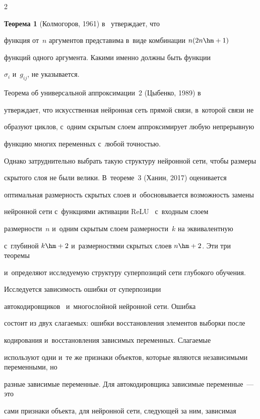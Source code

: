 \begin{multicols}{2}
\noindent


\textbf{Теорема 1} (Колмогоров, 1961) в~\cite{twentythree} утверждает, что 


функция от~$n$ аргументов представима в~виде комбинации $n(2n \hm+ 1)$ 


функций одного аргумента. Какими именно должны быть функции 


$\sigma_i$ и~$g_{ij}$, не указывается.


Теорема об универсальной аппроксимации~2 (Цыбенко, 1989) в~\cite{twentythree} 


утверждает, что искусственная нейронная сеть прямой связи, в~которой связи не 


образуют циклов, с~одним скрытым слоем аппроксимирует любую непрерывную 


функцию многих переменных с~любой точностью.


Однако затруднительно выбрать такую структуру нейронной сети, чтобы размеры 


скрытого слоя не были велики. В~теореме~3 (Ханин, 2017) оценивается 


оптимальная размерность скрытых слоев и~обосновывается возможность замены 


нейронной сети с~функциями активации ReLU~\cite{twentythree} с~входным слоем 


раз\-мер\-ности~$n$ и~одним скрытым слоем раз\-мер\-ности~$k$ на эквивалентную 


с~глубиной $k\hm+2$ и~размерностями скрытых слоев $n \hm+ 2$. Эти три тео\-ре\-мы 


и~определяют исследуемую структуру суперпозиций сети глубокого обучения.





Исследуется зависимость ошибки от суперпозиции 


автокодировщиков~\cite{eighteen} и~многослойной нейронной сети. Ошибка 


состоит из двух слагаемых: ошибки восстановления элементов выборки после 


кодирования и~восстановления зависимых переменных. Слагаемые 


используют одни и~те же признаки объектов, которые являются независимыми переменными, но 


разные зависимые переменные. Для автокодировщика зависимые переменные~--- это 


сами признаки объекта, для нейронной сети, следующей за ним, зависимая 



\end{multicols}
